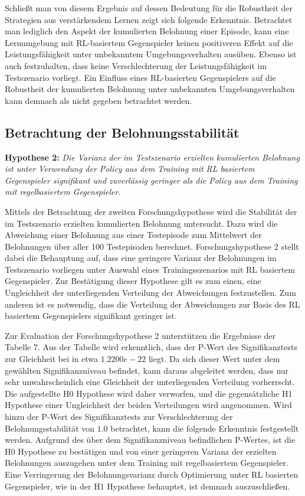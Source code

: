 Schließt man von diesem Ergebnis auf dessen Bedeutung für die Robustheit der Strategien aus verstärkendem Lernen zeigt sich folgende Erkenntnis.
Betrachtet man lediglich den Aspekt der kumulierten Belohnung einer Episode, kann eine Lernumgebung mit RL-basiertem Gegenspieler keinen positiveren Effekt auf die Leistungsfähigkeit unter unbekanntem Umgebungsverhalten ausüben.
Ebenso ist auch festzuhalten, dass keine Verschlechterung der Leistungsfähigkeit im Testszenario vorliegt. 
Ein Einfluss eines RL-basierten Gegenspielers auf die Robustheit der kumulierten Belohnung unter unbekannten Umgebungsverhalten kann demnach als nicht gegeben betrachtet werden.

\subsection{Betrachtung der Belohnungsstabilität}

\textbf{Hypothese 2:}
\textit{Die Varianz der im Testszenario erzielten kumulierten Belohnung ist unter Verwendung der Policy aus dem Training mit RL basiertem Gegenspieler signifikant und zuverlässig geringer als die Policy aus dem Training mit regelbasiertem Gegenspieler.}

Mittels der Betrachtung der zweiten Forschungshypothese wird die Stabilität der im Testszenario erzielten kumulierten Belohnung untersucht.
Dazu wird die Abweichung einer Belohnung aus einer Testepisode zum Mittelwert der Belohnungen über aller 100 Testepisoden berechnet.
Forschungshypothese 2 stellt dabei die Behauptung auf, dass eine geringere Varianz der Belohnungen im Testszenario vorliegen unter Auswahl eines Trainingsszenarios mit RL basiertem Gegenspieler.
Zur Bestätigung dieser Hypothese gilt es zum einen, eine Ungleichheit der unterliegenden Verteilung der Abweichungen festzustellen.
Zum anderen ist es notwendig, dass die Verteilung der Abweichungen zur Basis des RL basiertem Gegenspielers signifikant geringer ist.

Zur Evaluation der Forschungshypothese 2 unterstützen die Ergebnisse der Tabelle 7.
Aus der Tabelle wird erkenntlich, dass der P-Wert des Signifikanztests zur Gleichheit bei in etwa $1.2200e-22$ liegt.
Da sich dieser Wert unter dem gewählten Signifikanzniveau befindet, kann daraus abgeleitet werden, dass nur sehr unwahrscheinlich eine Gleichheit der unterliegenden Verteilung vorherrscht.
Die aufgestellte H0 Hypothese wird daher verworfen, und die gegensätzliche H1 Hypothese einer Ungleichheit der beiden Verteilungen wird angenommen.
Wird hinzu der P-Wert des Signifikanztests zur Verschlechterung der Belohnungsstabilität von $1.0$ betrachtet, kann die folgende Erkenntnis festgestellt werden.
Aufgrund des über dem Signifikanzniveau befindlichen P-Wertes, ist die H0 Hypothese zu bestätigen und von einer geringeren Varianz der erzielten Belohnungen auszugehen unter dem Training mit regelbasiertem Gegenspieler.
Eine Verringerung der Belohnungsvarianz durch Optimierung unter RL basierten Gegenspieler, wie in der H1 Hypothese behauptet, ist demnach auszuschließen.

